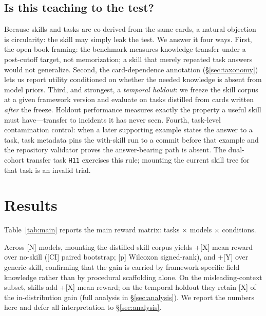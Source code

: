 \documentclass[11pt]{article}
\begin{document}
\subsection{Is this teaching to the test?}
\label{sec:teaching-to-test}

Because skills and tasks are co-derived from the same cards, a natural objection is circularity: the skill may simply leak the test.
We answer it four ways.
First, the open-book framing: the benchmark measures knowledge transfer under a post-cutoff target, not memorization; a skill that merely repeated task answers would not generalize.
Second, the card-dependence annotation (\S\ref{sec:taxonomy}) lets us report utility conditioned on whether the needed knowledge is absent from model priors.
Third, and strongest, a \emph{temporal holdout}: we freeze the skill corpus at a given framework version and evaluate on tasks distilled from cards written \emph{after} the freeze.
Holdout performance measures exactly the property a useful skill must have---transfer to incidents it has never seen.
Fourth, task-level contamination control: when a later supporting example states the answer to a task, task metadata pins the with-skill run to a commit before that example and the repository validator proves the answer-bearing path is absent.
The dual-cohort transfer task \texttt{H11} exercises this rule; mounting the current skill tree for that task is an invalid trial.

\section{Results}
\label{sec:results}

Table~\ref{tab:main} reports the main reward matrix: tasks $\times$ models $\times$ conditions.

\begin{table}[t]
\centering
{}
\caption{Main results. Reward (median over three runs) per task, model, and condition. Summary rows report mean deltas of distilled-skill over no-skill and over generic-skill.}
\label{tab:main}
\end{table}

Across [N] models, mounting the distilled skill corpus yields +[X] mean reward over no-skill ([CI] paired bootstrap; [p] Wilcoxon signed-rank), and +[Y] over generic-skill, confirming that the gain is carried by framework-specific field knowledge rather than by procedural scaffolding alone.
On the misleading-context subset, skills add +[X] mean reward; on the temporal holdout they retain [X] of the in-distribution gain (full analysis in \S\ref{sec:analysis}).
We report the numbers here and defer all interpretation to \S\ref{sec:analysis}.
\end{document}
